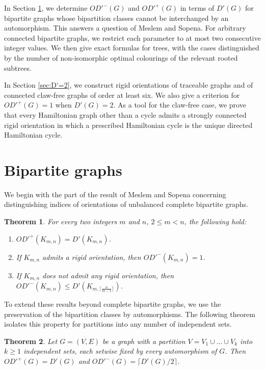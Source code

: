 \documentclass[a4paper,12pt]{elsarticle}
\newtheorem{theorem}{Theorem}
\begin{document}
In Section \ref{sec:bipartite}, we determine $OD'^-(G)$ and $OD'^+(G)$ in terms of $D'(G)$ for bipartite graphs whose bipartition classes cannot be interchanged by an automorphism. This answers a question of Meslem and Sopena. For arbitrary connected bipartite graphs, we restrict each parameter to at most two consecutive integer values. We then give exact formulas for trees, with the cases distinguished by the number of non-isomorphic optimal colourings of the relevant rooted subtrees.

In Section \ref{sec:D'=2}, we construct rigid orientations of traceable graphs and of connected claw-free graphs of order at least six. We also give a criterion for $OD'^+(G)=1$ when $D'(G)=2$. As a tool for the claw-free case, we prove that every Hamiltonian graph other than a cycle admits a strongly connected rigid orientation in which a prescribed Hamiltonian cycle is the unique directed Hamiltonian cycle.


\section{Bipartite graphs} \label{sec:bipartite}

We begin with the part of the result of Meslem and Sopena \cite{MeslemSopena} concerning distinguishing indices of orientations of unbalanced complete bipartite graphs.

\begin{theorem} \cite{MeslemSopena}
For every two integers $m$ and $n$, $2 \leq m < n$, the following hold:
\begin{enumerate}
    \item $OD'^+(K_{m,n})=D'(K_{m,n})$.
    \item If $K_{m,n}$ admits a rigid orientation, then $OD'^-(K_{m,n})=1$.
    \item If $K_{m,n}$ does not admit any rigid orientation, then $OD'^-(K_{m,n}) \leq D'(K_{m,\lceil \frac{n}{m-1}\rceil})$.
\end{enumerate}
\end{theorem}

To extend these results beyond complete bipartite graphs, we use the preservation of the bipartition classes by automorphisms. The following theorem isolates this property for partitions into any number of independent sets.

\begin{theorem} \label{lemma: part_indep}
Let $G=(V,E)$ be a graph with a partition $V=V_1\cup\dots\cup V_k$ into $k\geq 1$ independent sets, each setwise fixed by every automorphism of $G$. Then $OD'^+(G)=D'(G)$ and $OD'^-(G)=\lceil D'(G)/2\rceil$.
\end{theorem}
\end{document}

